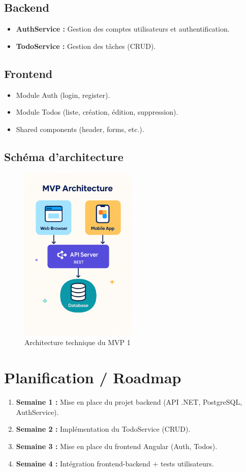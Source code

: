 \subsection{Backend}
\begin{itemize}
	\item \textbf{AuthService :} Gestion des comptes utilisateurs et authentification.
	\item \textbf{TodoService :} Gestion des tâches (CRUD).
\end{itemize}

\subsection{Frontend}
\begin{itemize}
	\item Module Auth (login, register).
	\item Module Todos (liste, création, édition, suppression).
	\item Shared components (header, forms, etc.).
\end{itemize}

\subsection{Schéma d’architecture}
\begin{figure}[H]
	\centering
	\includegraphics[width=0.5\textwidth]{images/Archi_mvp.png}
	\caption{Architecture technique du MVP 1}
\end{figure}

\section{Planification / Roadmap}
\begin{enumerate}
	\item \textbf{Semaine 1 :} Mise en place du projet backend (API .NET, PostgreSQL, AuthService). 
	\item \textbf{Semaine 2 :} Implémentation du TodoService (CRUD).
	\item \textbf{Semaine 3 :} Mise en place du frontend Angular (Auth, Todos).
	\item \textbf{Semaine 4 :} Intégration frontend-backend + tests utilisateurs.
\end{enumerate}
